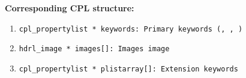 \begin{datastructdef}
\textbf{Corresponding \ac{CPL} structure:}
\begin{enumerate}
    \item \texttt{cpl\_propertylist * keywords: Primary keywords (,  ,  )}
    \item \texttt{hdrl\_image * images[]: Images image}
    \item \texttt{cpl\_propertylist * plistarray[]: Extension keywords}
\end{enumerate}
\end{datastructdef}


\paragraph{}\label{dataitem:badpix_map_det}\label{dataitem:badpixmap}

